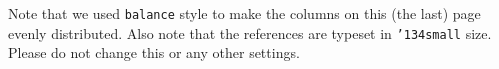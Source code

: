 \documentclass[10pt,nocopyrightspace]{ewsn-proc}
\begin{document}
Note that we used \texttt{balance} style to make the columns on this (the last) page evenly distributed. Also note that the references are typeset in \texttt{{\char'134}small} size. Please do not change this or any other settings.


%
%
\balance

\end{document}
